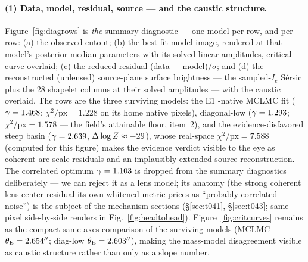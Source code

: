 \paragraph{(1) Data, model, residual, source --- and the caustic
structure.}
Figure~\ref{fig:diagrows} is \emph{the} summary diagnostic --- one model
per row, and per row: (a) the observed cutout; (b) the best-fit model
image, rendered at that model's posterior-median parameters with its
solved linear amplitudes, critical curve overlaid; (c) the reduced
residual (data$\,-\,$model)$/\sigma$; and (d) the reconstructed
(unlensed) source-plane surface brightness --- the sampled-$I_e$
S\'ersic plus the 28 shapelet columns at their solved amplitudes --- with
the caustic overlaid. The rows are the three surviving models: the E1
-native MCLMC fit ($\gamma=1.468$;
$\chi^2/\mathrm{px}=1.228$ on its home native pixels), diagonal-low
($\gamma=1.293$; $\chi^2/\mathrm{px}=1.578$ --- the field's attainable
floor, item~2), and the evidence-disfavored steep basin
($\gamma=2.639$, $\Delta\log Z\approx-29$), whose real-space
$\chi^2/\mathrm{px}=7.588$ (computed for this figure) makes the evidence
verdict visible to the eye as coherent arc-scale residuals and an
implausibly extended source reconstruction. The correlated optimum
$\gamma=1.103$ is dropped from the summary diagnostics deliberately
--- we can reject it as a lens model; its anatomy (the strong coherent
lens-center residual its own whitened metric prices as ``probably
correlated noise'') is the subject of the mechanism sections
(\S\ref{sec:t041}, \S\ref{sec:t043}; same-pixel side-by-side renders in
Fig.~\ref{fig:headtohead}). Figure~\ref{fig:critcurves} remains as the
compact same-axes comparison of the surviving models (MCLMC
$\theta_{\mathrm{E}}=2.654''$; diag-low $\theta_{\mathrm{E}}=2.603''$), making the mass-model
disagreement visible as caustic structure rather than only as a slope
number.

